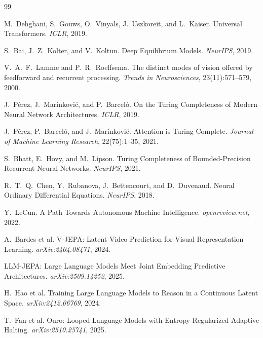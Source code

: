 \documentclass[11pt, a4paper]{article}
\theoremstyle{plain}
\theoremstyle{definition}
\theoremstyle{remark}
\begin{document}

\begin{thebibliography}{99}

M.~Dehghani, S.~Gouws, O.~Vinyals, J.~Uszkoreit, and L.~Kaiser.
\newblock Universal Transformers.
\newblock \emph{ICLR}, 2019.

S.~Bai, J.~Z.~Kolter, and V.~Koltun.
\newblock Deep Equilibrium Models.
\newblock \emph{NeurIPS}, 2019.

V.~A.~F.~Lamme and P.~R.~Roelfsema.
\newblock The distinct modes of vision offered by feedforward and recurrent processing.
\newblock \emph{Trends in Neurosciences}, 23(11):571--579, 2000.

J.~P\'{e}rez, J.~Marinkovi\'{c}, and P.~Barcel\'{o}.
\newblock On the Turing Completeness of Modern Neural Network Architectures.
\newblock \emph{ICLR}, 2019.

J.~P\'{e}rez, P.~Barcel\'{o}, and J.~Marinkovi\'{c}.
\newblock Attention is Turing Complete.
\newblock \emph{Journal of Machine Learning Research}, 22(75):1--35, 2021.

S.~Bhatt, E.~Hovy, and M.~Lipson.
\newblock Turing Completeness of Bounded-Precision Recurrent Neural Networks.
\newblock \emph{NeurIPS}, 2021.

R.~T.~Q.~Chen, Y.~Rubanova, J.~Bettencourt, and D.~Duvenaud.
\newblock Neural Ordinary Differential Equations.
\newblock \emph{NeurIPS}, 2018.

Y.~LeCun.
\newblock A Path Towards Autonomous Machine Intelligence.
\newblock \emph{openreview.net}, 2022.

A.~Bardes et al.
\newblock V-JEPA: Latent Video Prediction for Visual Representation Learning.
\newblock \emph{arXiv:2404.08471}, 2024.

LLM-JEPA: Large Language Models Meet Joint Embedding Predictive Architectures.
\newblock \emph{arXiv:2509.14252}, 2025.

H.~Hao et al.
\newblock Training Large Language Models to Reason in a Continuous Latent Space.
\newblock \emph{arXiv:2412.06769}, 2024.

T.~Fan et al.
\newblock Ouro: Looped Language Models with Entropy-Regularized Adaptive Halting.
\newblock \emph{arXiv:2510.25741}, 2025.


\end{thebibliography}
\end{document}
